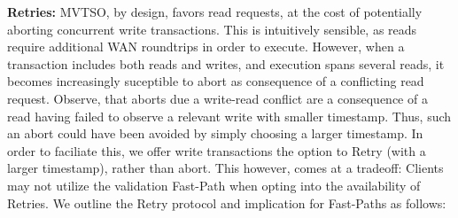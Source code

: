 

\textbf{Retries:} MVTSO, by design, favors read requests, at the cost of potentially aborting concurrent write transactions. This is intuitively sensible, as reads require additional WAN roundtrips in order to execute. 
However, when a transaction includes both reads and writes, and execution spans several reads, it becomes increasingly suceptible to abort as consequence of a conflicting read request. Observe, that aborts due a write-read conflict are a consequence of a read having failed to observe a relevant write with smaller timestamp. Thus, such an abort could have been avoided by simply choosing a larger timestamp. In order to faciliate this, we offer write transactions the option to Retry (with a larger timestamp), rather than abort. This however, comes at a tradeoff: Clients may not utilize the validation Fast-Path when opting into the availability of Retries. We outline the Retry protocol and implication for Fast-Paths as follows:

